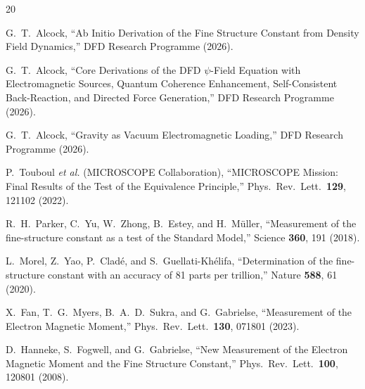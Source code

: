 \documentclass[aps,prd,twocolumn,superscriptaddress,nofootinbib]{revtex4-2}
\begin{document}
\begin{thebibliography}{20}

G.~T.~Alcock,
``Ab Initio Derivation of the Fine Structure Constant from
Density Field Dynamics,''
DFD Research Programme (2026).

G.~T.~Alcock,
``Core Derivations of the DFD $\psi$-Field Equation
with Electromagnetic Sources, Quantum Coherence Enhancement,
Self-Consistent Back-Reaction, and Directed Force Generation,''
DFD Research Programme (2026).

G.~T.~Alcock,
``Gravity as Vacuum Electromagnetic Loading,''
DFD Research Programme (2026).

P.~Touboul \textit{et al.} (MICROSCOPE Collaboration),
``MICROSCOPE Mission: Final Results of the Test of the
Equivalence Principle,''
Phys.\ Rev.\ Lett.\ \textbf{129}, 121102 (2022).

R.~H.~Parker, C.~Yu, W.~Zhong, B.~Estey, and H.~M\"uller,
``Measurement of the fine-structure constant as a test of
the Standard Model,''
Science \textbf{360}, 191 (2018).

L.~Morel, Z.~Yao, P.~Clad\'e, and S.~Guellati-Kh\'elifa,
``Determination of the fine-structure constant with an accuracy
of 81 parts per trillion,''
Nature \textbf{588}, 61 (2020).

X.~Fan, T.~G.~Myers, B.~A.~D.~Sukra, and G.~Gabrielse,
``Measurement of the Electron Magnetic Moment,''
Phys.\ Rev.\ Lett.\ \textbf{130}, 071801 (2023).

D.~Hanneke, S.~Fogwell, and G.~Gabrielse,
``New Measurement of the Electron Magnetic Moment and the
Fine Structure Constant,''
Phys.\ Rev.\ Lett.\ \textbf{100}, 120801 (2008).

\end{thebibliography}
\end{document}
